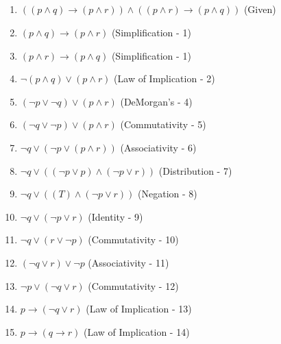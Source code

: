 \documentclass[11pt]{article}
\makeatletter
\def\imp{\rightarrow}
\renewenvironment{proof}[1][\proofname]{\par
  \normalfont \topsep6\p@\@plus6\p@\relax
  \trivlist
  \item[\hskip\labelsep
        \itshape
    #1\@addpunct{.}]\ignorespaces
}{%
  \endtrivlist\@endpefalse
}
\makeatother
\begin{document}
\subsection{} %
\begin{proof}[\textbf{Prove $p \imp ((q \imp r) \land (r \imp q))$}] \leavevmode
	\begin{enumerate}
		\item $((p \land q) \imp (p \land r)) \land ((p \land r) \imp (p \land q))$ \hfill (Given)
		\item $(p \land q) \imp (p \land r)$ \hfill (Simplification - 1)
		\item $(p \land r) \imp (p \land q)$ \hfill (Simplification - 1)
		\item $\neg (p \land q) \lor (p \land r)$ \hfill (Law of Implication - 2)
		\item $(\neg p \lor \neg q) \lor (p \land r)$ \hfill (DeMorgan's - 4)
		\item $(\neg q \lor \neg p) \lor (p \land r)$ \hfill (Commutativity - 5)
		\item $\neg q \lor (\neg p \lor (p \land r))$ \hfill (Associativity - 6)
		\item $\neg q \lor ((\neg p \lor p) \land (\neg p \lor r))$ \hfill (Distribution - 7)
		\item $\neg q \lor ((T) \land (\neg p \lor r))$ \hfill (Negation - 8)
		\item $\neg q \lor (\neg p \lor r)$ \hfill (Identity - 9)
		\item $\neg q \lor (r \lor \neg p)$ \hfill (Commutativity - 10)
		\item $(\neg q \lor r) \lor \neg p$ \hfill (Associativity - 11)
		\item $\neg p \lor (\neg q \lor r)$ \hfill (Commutativity - 12)
		\item $p \imp (\neg q \lor r)$ \hfill (Law of Implication - 13)
		\item $p \imp (q \imp r)$ \hfill (Law of Implication - 14)
		

\end{enumerate}
\end{proof}
\end{document}
